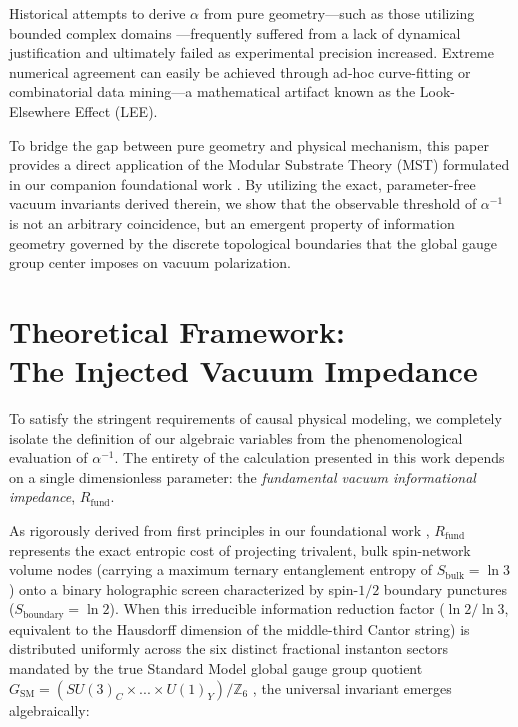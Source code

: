 \documentclass[12pt,a4paper]{article}
\begin{document}
Historical attempts to derive $\alpha$ from pure geometry—such as those utilizing bounded complex domains \cite{wyler1971}—frequently suffered from a lack of dynamical justification and ultimately failed as experimental precision increased. Extreme numerical agreement can easily be achieved through ad-hoc curve-fitting or combinatorial data mining—a mathematical artifact known as the Look-Elsewhere Effect (LEE).

To bridge the gap between pure geometry and physical mechanism, this paper provides a direct application of the Modular Substrate Theory (MST) formulated in our companion foundational work \cite{peinador2026_foundational}. By utilizing the exact, parameter-free vacuum invariants derived therein, we show that the observable threshold of $\alpha^{-1}$ is not an arbitrary coincidence, but an emergent property of information geometry governed by the discrete topological boundaries that the global gauge group center imposes on vacuum polarization.


\section{\texorpdfstring{Theoretical Framework:\\ The Injected Vacuum Impedance}{Theoretical Framework: The Injected Vacuum Impedance}}

To satisfy the stringent requirements of causal physical modeling, we completely isolate the definition of our algebraic variables from the phenomenological evaluation of $\alpha^{-1}$. The entirety of the calculation presented in this work depends on a single dimensionless parameter: the \textit{fundamental vacuum informational impedance}, $R_{\text{fund}}$.

As rigorously derived from first principles in our foundational work \cite{peinador2026_foundational}, $R_{\text{fund}}$ represents the exact entropic cost of projecting trivalent, bulk spin-network volume nodes (carrying a maximum ternary entanglement entropy of $S_{\text{bulk}} = \ln 3$) onto a binary holographic screen characterized by spin-$1/2$ boundary punctures ($S_{\text{boundary}} = \ln 2$). When this irreducible information reduction factor ($\ln 2 / \ln 3$, equivalent to the Hausdorff dimension of the middle-third Cantor string) is distributed uniformly across the six distinct fractional instanton sectors mandated by the true Standard Model global gauge group quotient $G_{\text{SM}} = (SU(3)_C \times ... \times U(1)_Y) / \mathbb{Z}_6$ \cite{aharony2013}, the universal invariant emerges algebraically:
\end{document}
